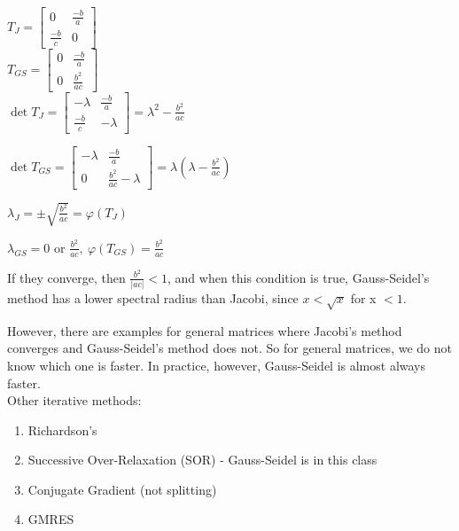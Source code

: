 \documentclass[12pt, letterpaper]{article}
\begin{document}
$T_J = 
\begin{bmatrix}
    0 & \frac{-b}{a} \\
    \frac{-b}{c} & 0
\end{bmatrix}$ \\

$T_{GS} = 
\begin{bmatrix}
    0 & \frac{-b}{a} \\
    0 & \frac{b^2}{ac}
\end{bmatrix}$ \\

$\det T_J= \begin{bmatrix}
    -\lambda & \frac{-b}{a} \\
    \frac{-b}{c} & -\lambda
\end{bmatrix} = \lambda^2-\frac{b^2}{ac}$

$\det T_{GS}= \begin{bmatrix}
    -\lambda & \frac{-b}{a} \\
    0 & \frac{b^2}{ac}-\lambda
\end{bmatrix} = \lambda(\lambda-\frac{b^2}{ac})$

$\lambda_J = \pm \sqrt{\frac{b^2}{ac}} = \varphi(T_J)$

$\lambda_{GS} = 0 \text{ or } \frac{b^2}{ac},\ \varphi(T_{GS}) = \frac{b^2}{ac}$

If they converge, then $\frac{b^2}{|ac|}<1$, and when this condition is true, 
Gauss-Seidel's method has a lower spectral radius than Jacobi, since $x < \sqrt{x}$ for x $<1$.

However, there are examples for general matrices where Jacobi's method converges and 
Gauss-Seidel's method does not. So for general matrices, we do not know which one is faster. 
In practice, however, Gauss-Seidel is almost always faster. \\

\noindent Other iterative methods:
\begin{enumerate}
    \item Richardson's
    \item Successive Over-Relaxation (SOR) - Gauss-Seidel is in this class
    \item Conjugate Gradient (not splitting)
    \item GMRES
\end{enumerate}
\end{document}
